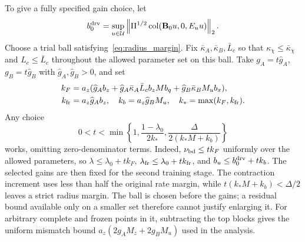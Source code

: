 \documentclass[journal]{IEEEtran}
\theoremstyle{plain}
\theoremstyle{definition}
\newcommand{\mB}{\mathbf{B}}
\newcommand{\norm}[1]{\left\lVert #1\right\rVert}
\newcommand{\col}{\operatorname{col}}
\begin{document}
To give a fully specified gain choice, let
\begin{equation*}
b_0^{\rm drv}=\sup_{u\in\mathcal U}
\norm{\Pi^{1/2}\col(\mB_0u,0,E_uu)}_2.
\end{equation*}
Choose a trial ball satisfying~\eqref{eq:radius_margin}. Fix $\bar\kappa_A,\bar\kappa_B,\bar L_c$ so that $\kappa_\chi\le\bar\kappa_\chi$ and $L_c\le\bar L_c$ throughout the allowed parameter set on this ball. Take $g_A=t\widehat g_A$, $g_B=t\widehat g_B$ with $\widehat g_A,\widehat g_B>0$, and set
\begin{equation}
\begin{split}
k_F&=a_z(\widehat g_A b_z+\widehat g_A\bar\kappa_A\bar L_c b_zMb_q
+\widehat g_B\bar\kappa_BM_ub_x),\\
k_{\rm fr}&=a_z\widehat g_A b_z,\quad k_b=a_z\widehat g_BM_u,
\quad k_* =\max(k_F,k_{\rm fr}).
\end{split}
\label{eq:gain_coefficients}
\end{equation}
Any choice
\begin{equation}
0<t<\min\left\{1,\frac{1-\lambda_0}{2k_*},
\frac{\Delta}{2(k_*M+k_b)}\right\}
\label{eq:gain_choice}
\end{equation}
works, omitting zero-denominator terms. Indeed, $\nu_{\rm bd}\le tk_F$ uniformly over the allowed parameters, so $\lambda\le\lambda_0+tk_F$, $\lambda_{\rm fr}\le\lambda_0+tk_{\rm fr}$, and $b_u\le b_0^{\rm drv}+tk_b$. The selected gains are then fixed for the second training stage. The contraction increment uses less than half the original rate margin, while $t(k_*M+k_b)<\Delta/2$ leaves a strict radius margin. The ball is chosen before the gains; a residual bound available only on a smaller set therefore cannot justify enlarging it. For arbitrary complete and frozen points in it, subtracting the top blocks gives the uniform mismatch bound $a_z(2g_AM_z+2g_BM_u)$ used in the analysis.
\end{document}
